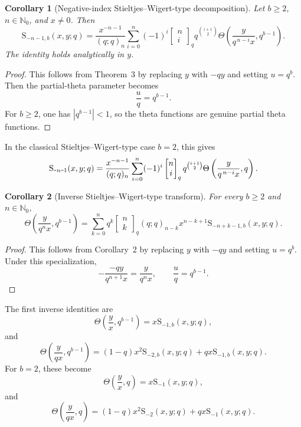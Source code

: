 \documentclass[12pt]{article}
\newcommand{\minus}{\textup{\texttt{-}}}
\newcommand{\s}{\mathrm{S}}
\newtheorem{corollary}{Corollary}
\begin{document}
\begin{corollary}[Negative-index Stieltjes--Wigert-type decomposition]
Let \(b\geq2\), \(n\in\mathbb N_0\), and \(x\neq0\). Then
\[
\s_{-n-1,b}(x,y;q)
=
\frac{x^{-n-1}}{(q;q)_n}
\sum_{i=0}^{n}
(-1)^i
\begin{bmatrix}
n\\ i
\end{bmatrix}_{q}
q^{\binom{i+1}{2}}
\Theta\left(
\frac{y}{q^{\,n-i}x},
q^{b-1}
\right).
\]
The identity holds analytically in \(y\).
\end{corollary}
\begin{proof}
This follows from Theorem~3 by replacing \(y\) with \(-qy\) and setting
\(u=q^b\). Then the partial-theta parameter becomes
\[
\frac{u}{q}=q^{b-1}.
\]
For \(b\geq2\), one has \(|q^{b-1}|<1\), so the theta functions are genuine partial theta functions. 
\end{proof}

In the classical Stieltjes--Wigert-type case \(b=2\), this gives 
\[ 
\s_{\minus n\minus1}(x,y;q) = \frac{x^{-n-1}}{(q;q)_n} \sum_{i=0}^{n} (-1)^i \begin{bmatrix} n\\ i \end{bmatrix}_{q} q^{\binom{i+1}{2}} \Theta\left( \frac{y}{q^{\,n-i}x}, q \right). 
\]

\begin{corollary}[Inverse Stieltjes--Wigert-type transform]
For every \(b\geq2\) and \(n\in\mathbb N_0\),
\[
\Theta\left(
\frac{y}{q^n x},
q^{b-1}
\right)
=
\sum_{k=0}^{n}
q^k
\begin{bmatrix}
n\\ k
\end{bmatrix}_{q}
(q;q)_{n-k}
x^{n-k+1}
\s_{-n+k-1,b}(x,y;q).
\]
\end{corollary}
\begin{proof}
This follows from Corollary~2 by replacing \(y\) with \(-qy\) and
setting \(u=q^b\). Under this specialization,
\[
-\frac{-qy}{q^{n+1}x}
=
\frac{y}{q^n x},
\qquad
\frac{u}{q}=q^{b-1}.
\]
\end{proof}

The first inverse identities are 
\[ 
\Theta\left(\frac{y}{x},q^{b-1}\right) = x\s_{-1,b}(x,y;q), 
\] 
and 
\[ 
\Theta\left(\frac{y}{qx},q^{b-1}\right) = (1-q)x^2\s_{-2,b}(x,y;q) + qx\s_{-1,b}(x,y;q). 
\] 
For \(b=2\), these become \[ \Theta\left(\frac{y}{x},q\right) = x\s_{-1}(x,y;q), 
\] 
and 
\[ 
\Theta\left(\frac{y}{qx},q\right) = (1-q)x^2\s_{-2}(x,y;q) + qx\s_{-1}(x,y;q). 
\]
\end{document}
